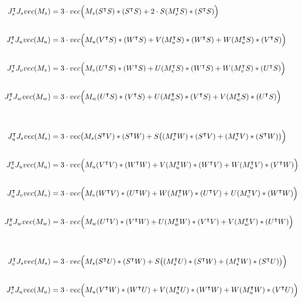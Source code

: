 \documentclass{article}
\begin{document}
\newpage
\begin{eqnarray*}
    J_s^\intercal J_svec(M_s) & = 3\cdot vec\Bigl(M_s(S^\intercal S)\ast (S^\intercal S) + 2\cdot S(M_s^\intercal S)\ast (S^\intercal S)\Bigl) \\ \\
    J_s^\intercal J_uvec(M_u) & = 3\cdot vec\Bigl(M_u(V^\intercal S)\ast (W^\intercal S) + V(M_u^\intercal S)\ast (W^\intercal S) + W(M_u^\intercal S)\ast (V^\intercal S)\Bigl) \\ \\
    J_s^\intercal J_vvec(M_v) & = 3\cdot vec\Bigl(M_v(U^\intercal S)\ast (W^\intercal S) + U(M_v^\intercal S)\ast (W^\intercal S) + W(M_v^\intercal S)\ast (U^\intercal S)\Bigl) \\ \\
    J_s^\intercal J_wvec(M_w) & = 3\cdot vec\Bigl(M_w(U^\intercal S)\ast (V^\intercal S) + U(M_w^\intercal S)\ast (V^\intercal S) + V(M_w^\intercal S)\ast (U^\intercal S)\Bigl) \\ \\ \\
    J_u^\intercal J_svec(M_s) & = 3\cdot vec\bigl(M_s(S^\intercal V)\ast (S^\intercal W) + S\bigl((M_s^\intercal W)\ast (S^\intercal V) + (M_s^\intercal V)\ast (S^\intercal W)\bigl)\Bigl) \\ \\
    J_u^\intercal J_uvec(M_u) & = 3\cdot vec\Bigl(M_u(V^\intercal V)\ast (W^\intercal W) + V(M_u^\intercal W)\ast (W^\intercal V) + W(M_u^\intercal V)\ast (V^\intercal W)\Bigl) \\ \\
    J_u^\intercal J_vvec(M_v) & = 3\cdot vec\Bigl(M_v(W^\intercal V)\ast (U^\intercal W) + W(M_v^\intercal W)\ast (U^\intercal V) + U(M_v^\intercal V)\ast (W^\intercal W)\Bigl) \\ \\
    J_u^\intercal J_wvec(M_w) & = 3\cdot vec\Bigl(M_w(U^\intercal V)\ast (V^\intercal W) + U(M_w^\intercal W)\ast (V^\intercal V) + V(M_w^\intercal V)\ast (U^\intercal W)\Bigl) \\ \\ \\
    J_v^\intercal J_svec(M_s) & = 3\cdot vec\Bigl(M_s(S^\intercal U)\ast (S^\intercal W) + S\bigl((M_s^\intercal U)\ast (S^\intercal W) + (M_s^\intercal W)\ast (S^\intercal U)\bigl)\Bigl) \\ \\
    J_v^\intercal J_uvec(M_u) & = 3\cdot vec\Bigl(M_u(V^\intercal W)\ast (W^\intercal U) + V(M_u^\intercal U)\ast (W^\intercal W) + W(M_u^\intercal W)\ast (V^\intercal U)\Bigl) \\ \\

\end{eqnarray*}
\end{document}
